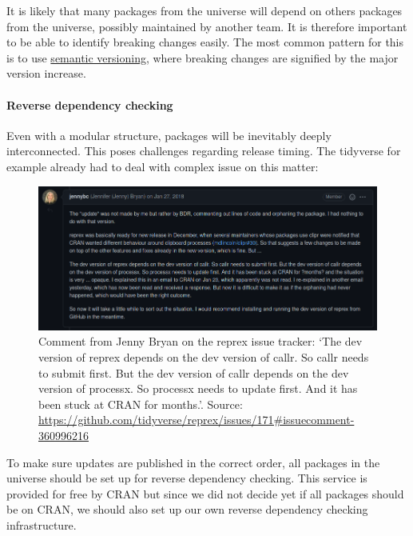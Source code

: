 \documentclass[
  letterpaper,
  DIV=11,
  numbers=noendperiod]{scrartcl}
\begin{document}
It is likely that many packages from the universe will depend on others
packages from the universe, possibly maintained by another team. It is
therefore important to be able to identify breaking changes easily. The
most common pattern for this is to use
\href{https://semver.org/}{semantic versioning}, where breaking changes
are signified by the major version increase.

\hypertarget{sec-revdeps}{%
\paragraph{Reverse dependency checking}\label{sec-revdeps}}

Even with a modular structure, packages will be inevitably deeply
interconnected. This poses challenges regarding release timing. The
tidyverse for example already had to deal with complex issue on this
matter:

\begin{figure}

{\centering \includegraphics{images/paste-4C7C6C13.png}

}

\caption{Comment from Jenny Bryan on the reprex issue tracker: `The dev
version of reprex depends on the dev version of callr. So callr needs to
submit first. But the dev version of callr depends on the dev version of
processx. So processx needs to update first. And it has been stuck at
CRAN for months.'. Source:
\url{https://github.com/tidyverse/reprex/issues/171\#issuecomment-360996216}}

\end{figure}

To make sure updates are published in the correct order, all packages in
the universe should be set up for reverse dependency checking. This
service is provided for free by CRAN but since we did not decide yet if
all packages should be on CRAN, we should also set up our own reverse
dependency checking infrastructure.
\end{document}
